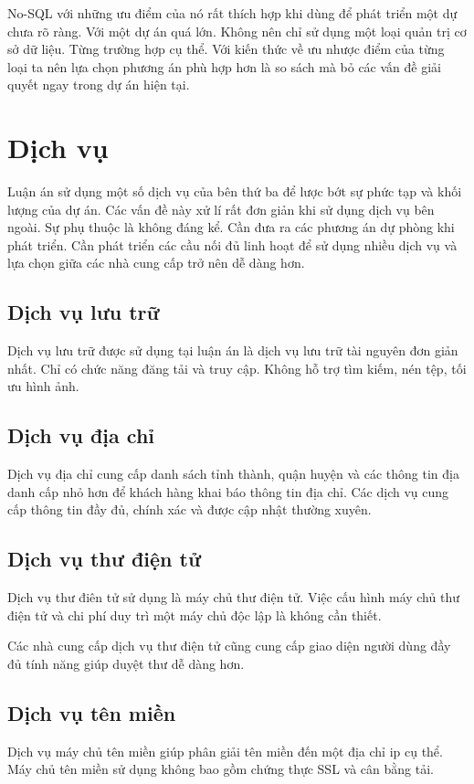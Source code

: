 {{No-SQL với những ưu điểm của nó rất thích hợp khi dùng để phát triển một dự chưa rõ ràng. Với một dự án quá lớn. Không nên chỉ sử dụng một loại quản trị cơ sở dữ liệu. Từng trường hợp cụ thể. Với kiến thức về ưu nhược điểm của từng loại ta nên lựa chọn phương án phù hợp hơn là so sách mà bỏ các vấn đề giải quyết ngay trong dự án hiện tại.
\section{Dịch vụ}
Luận án sử dụng một số dịch vụ của bên thứ ba để lược bớt sự phức tạp và khối lượng của dự án. Các vấn đề này xử lí rất đơn giản khi sử dụng dịch vụ bên ngoài. Sự phụ thuộc là không đáng kể. Cần đưa ra các phương án dự phòng khi phát triển. Cần phát triển các cầu nối đủ linh hoạt để sử dụng nhiều dịch vụ và lựa chọn giữa các nhà cung cấp trở nên dễ dàng hơn.

\subsection{Dịch vụ lưu trữ}
Dịch vụ lưu trữ được sử dụng tại luận án là dịch vụ lưu trữ tài nguyên đơn giản nhất. Chỉ có chức năng đăng tải và truy cập. Không hỗ trợ tìm kiếm, nén tệp, tối ưu hình ảnh.

\subsection{Dịch vụ địa chỉ}
Dịch vụ địa chỉ cung cấp danh sách tỉnh thành, quận huyện và các thông tin địa danh cấp nhỏ hơn để khách hàng khai báo thông tin địa chỉ. Các dịch vụ cung cấp thông tin đầy đủ, chính xác và được cập nhật thường xuyên.

\subsection{Dịch vụ thư điện tử}
Dịch vụ thư điên tử sử dụng là máy chủ thư điện tử. Việc cấu hình máy chủ thư điện tử và chi phí duy trì một máy chủ độc lập là không cần thiết.

Các nhà cung cấp dịch vụ thư điện tử cũng cung cấp giao diện người dùng đầy đủ tính năng giúp duyệt thư dễ dàng hơn.

\subsection{Dịch vụ tên miền}
Dịch vụ máy chủ tên miền giúp phân giải tên miền đến một địa chỉ ip cụ thể. Máy chủ tên miền sử dụng không bao gồm chứng thực SSL và cân bằng tải.

}}
